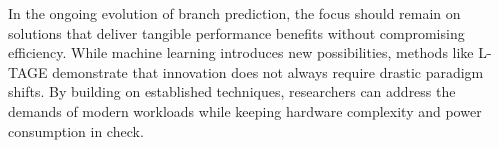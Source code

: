\documentclass[10pt,journal,compsoc]{IEEEtran}
\begin{document}
In the ongoing evolution of branch prediction, the focus should remain on solutions that deliver tangible performance benefits without compromising efficiency. While machine learning introduces new possibilities, methods like L-TAGE demonstrate that innovation does not always require drastic paradigm shifts. By building on established techniques, researchers can address the demands of modern workloads while keeping hardware complexity and power consumption in check.



    
    

\end{document}
